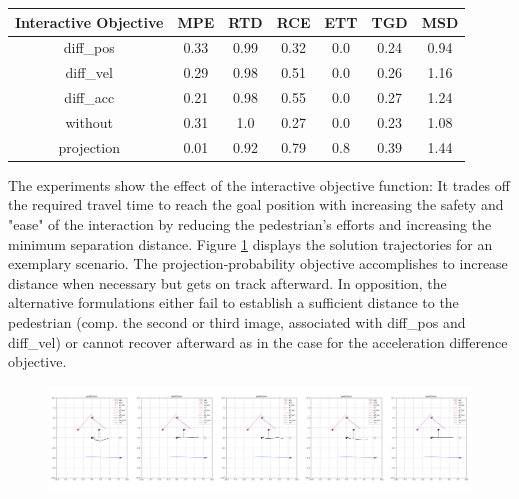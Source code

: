 \begin{table}[!ht]
\begin{center}
\begin{tabular}{c|c|c|c|c|c|c}
\bf Interactive Objective & \bf MPE & \bf RTD & \bf RCE & \bf ETT & \bf TGD & \bf MSD \\
\hline
diff\_pos & 0.33 & 0.99 & 0.32 & 0.0 & 0.24 & 0.94 \\
\hline
diff\_vel & 0.29 & 0.98 & 0.51 & 0.0 & 0.26 & 1.16 \\
\hline
diff\_acc & 0.21 & 0.98 & 0.55 & 0.0 & 0.27 & 1.24 \\ 
\hline
\rowcolor{baseline_color}
without & 0.31 & 1.0 & 0.27 & 0.0 & 0.23 & 1.08 \\ 
\hline
\rowcolor{our_color}
projection & 0.01 & 0.92 & 0.79 & 0.8 & 0.39 & 1.44 
\end{tabular}
\end{center}
\label{table:interactive_objective}
\end{table}

The experiments show the effect of the interactive objective function: It trades off the required travel time to reach the goal position with increasing the safety and "ease" of the interaction by reducing the pedestrian's efforts and increasing the minimum separation distance. Figure \ref{img:interactive_comp} displays the solution trajectories for an exemplary scenario.  The projection-probability objective accomplishes to increase distance when necessary but gets on track afterward. In opposition, the alternative formulations either fail to establish a sufficient distance to the pedestrian (comp. the second or third image, associated with diff\_pos and diff\_vel) or cannot recover afterward as in the case for the acceleration difference objective.

\begin{figure}[!ht]
\begin{center}
\includegraphics[width=\textwidth]{images/inter_comp_multi.png}
\label{img:interactive_comp}
\end{center}
\end{figure}

